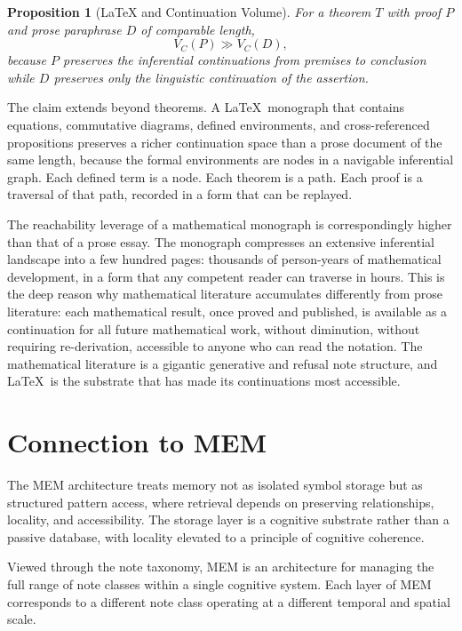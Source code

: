 \documentclass[12pt, a4paper]{article}
\theoremstyle{plain}
\newtheorem{proposition}[theorem]{Proposition}
\theoremstyle{definition}
\theoremstyle{remark}
\begin{document}
\begin{proposition}[LaTeX and Continuation Volume]
For a theorem $T$ with proof $P$ and prose paraphrase $D$ of comparable length,
\[
V_C(P) \gg V_C(D),
\]
because $P$ preserves the inferential continuations from premises to conclusion
while $D$ preserves only the linguistic continuation of the assertion.
\end{proposition}

The claim extends beyond theorems. A \LaTeX\ monograph that contains equations,
commutative diagrams, defined environments, and cross-referenced propositions
preserves a richer continuation space than a prose document of the same length,
because the formal environments are nodes in a navigable inferential graph. Each
defined term is a node. Each theorem is a path. Each proof is a traversal of that
path, recorded in a form that can be replayed.

The reachability leverage of a mathematical monograph is correspondingly higher
than that of a prose essay. The monograph compresses an extensive inferential
landscape into a few hundred pages: thousands of person-years of mathematical
development, in a form that any competent reader can traverse in hours. This is
the deep reason why mathematical literature accumulates differently from prose
literature: each mathematical result, once proved and published, is available as a
continuation for all future mathematical work, without diminution, without requiring
re-derivation, accessible to anyone who can read the notation. The mathematical
literature is a gigantic generative and refusal note structure, and \LaTeX\ is
the substrate that has made its continuations most accessible.

\section{Connection to MEM}

The MEM architecture treats memory not as isolated symbol storage but as
structured pattern access, where retrieval depends on preserving relationships,
locality, and accessibility. The storage layer is a cognitive substrate rather than
a passive database, with locality elevated to a principle of cognitive coherence.

Viewed through the note taxonomy, MEM is an architecture for managing the
full range of note classes within a single cognitive system. Each layer of
MEM corresponds to a different note class operating at a different
temporal and spatial scale.
\end{document}
